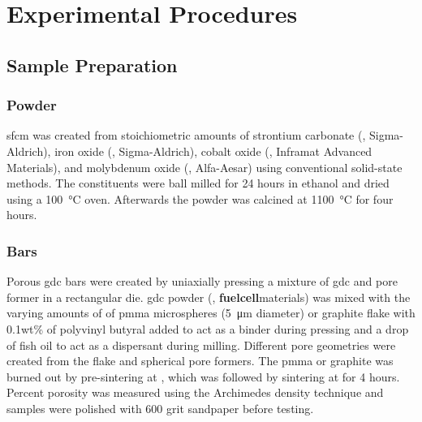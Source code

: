 
\chapter{Experimental Procedures}

\section{Sample Preparation}

    \subsection{ Powder}
        \gls{sfcm} was created from stoichiometric amounts of strontium carbonate (, Sigma-Aldrich), iron oxide (, Sigma-Aldrich), cobalt oxide (, Inframat Advanced Materials), and molybdenum oxide (, Alfa-Aesar) using conventional solid-state methods.
        The constituents were ball milled for 24 hours in ethanol and dried using a \SI{100}{\celsius} oven.
        Afterwards the powder was calcined at \SI{1100}{\celsius} for four hours.

    \subsection{Bars}
        Porous \gls{gdc} bars were created by uniaxially pressing a mixture of \gls{gdc} and pore former in a rectangular die.
        \Gls{gdc} powder (, \textbf{fuelcell}materials) was mixed with the varying amounts of of \gls{pmma} microspheres (\SI{5}{\micro\meter} diameter) or graphite flake with 0.1wt\% of polyvinyl butyral added to act as a binder during pressing and a drop of fish oil to act as a dispersant during milling.
        Different pore geometries were created from the flake and spherical pore formers.
        The \gls{pmma} or graphite was burned out by pre-sintering at , which was followed by sintering at  for 4 hours.
        Percent porosity was measured using the Archimedes density technique and samples were polished with 600 grit sandpaper before testing.

